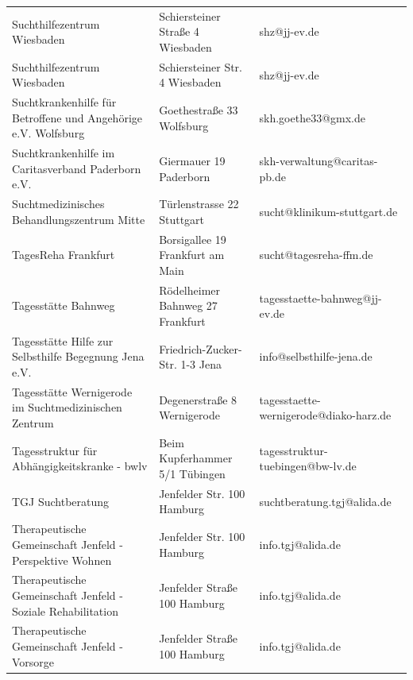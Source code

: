 {\begin{xltabular}{\textwidth} {
 >{\raggedright\arraybackslash}p{5cm}
 >{\raggedright\arraybackslash}X
 >{\raggedright\arraybackslash}p{5cm} }
Suchthilfezentrum Wiesbaden & Schiersteiner Straße 4 Wiesbaden & shz@jj-ev.de \\
Suchthilfezentrum Wiesbaden & Schiersteiner Str. 4 Wiesbaden & shz@jj-ev.de \\
Suchtkrankenhilfe für Betroffene und Angehörige e.V. Wolfsburg & Goethestraße 33 Wolfsburg & skh.goethe33@gmx.de \\
Suchtkrankenhilfe im Caritasverband Paderborn e.V. & Giermauer 19 Paderborn & skh-verwaltung@caritas-pb.de \\
Suchtmedizinisches Behandlungszentrum Mitte & Türlenstrasse 22 Stuttgart & sucht@klinikum-stuttgart.de \\
TagesReha Frankfurt & Borsigallee 19 Frankfurt am Main & sucht@tagesreha-ffm.de \\
Tagesstätte Bahnweg & Rödelheimer Bahnweg 27 Frankfurt & tagesstaette-bahnweg@jj-ev.de \\
Tagesstätte Hilfe zur Selbsthilfe Begegnung Jena e.V. & Friedrich-Zucker-Str. 1-3 Jena & info@selbsthilfe-jena.de \\
Tagesstätte Wernigerode im Suchtmedizinischen Zentrum & Degenerstraße 8 Wernigerode & tagesstaette-wernigerode@diako-harz.de \\
Tagesstruktur für Abhängigkeitskranke - bwlv & Beim Kupferhammer 5/1 Tübingen & tagesstruktur-tuebingen@bw-lv.de \\
TGJ Suchtberatung & Jenfelder Str. 100 Hamburg & suchtberatung.tgj@alida.de \\
Therapeutische Gemeinschaft Jenfeld - Perspektive Wohnen & Jenfelder Str. 100 Hamburg & info.tgj@alida.de \\
Therapeutische Gemeinschaft Jenfeld - Soziale Rehabilitation & Jenfelder Straße 100 Hamburg & info.tgj@alida.de \\
Therapeutische Gemeinschaft Jenfeld - Vorsorge & Jenfelder Straße 100 Hamburg & info.tgj@alida.de \\

\end{xltabular}}
